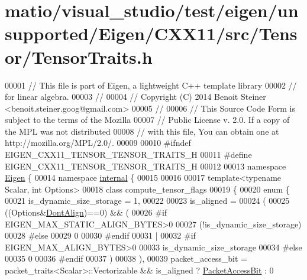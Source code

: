 \hypertarget{matio_2visual__studio_2test_2eigen_2unsupported_2_eigen_2_c_x_x11_2src_2_tensor_2_tensor_traits_8h_source}{}\section{matio/visual\+\_\+studio/test/eigen/unsupported/\+Eigen/\+C\+X\+X11/src/\+Tensor/\+Tensor\+Traits.h}
\label{matio_2visual__studio_2test_2eigen_2unsupported_2_eigen_2_c_x_x11_2src_2_tensor_2_tensor_traits_8h_source}

\begin{DoxyCode}
00001 \textcolor{comment}{// This file is part of Eigen, a lightweight C++ template library}
00002 \textcolor{comment}{// for linear algebra.}
00003 \textcolor{comment}{//}
00004 \textcolor{comment}{// Copyright (C) 2014 Benoit Steiner <benoit.steiner.goog@gmail.com>}
00005 \textcolor{comment}{//}
00006 \textcolor{comment}{// This Source Code Form is subject to the terms of the Mozilla}
00007 \textcolor{comment}{// Public License v. 2.0. If a copy of the MPL was not distributed}
00008 \textcolor{comment}{// with this file, You can obtain one at http://mozilla.org/MPL/2.0/.}
00009 
00010 \textcolor{preprocessor}{#ifndef EIGEN\_CXX11\_TENSOR\_TENSOR\_TRAITS\_H}
00011 \textcolor{preprocessor}{#define EIGEN\_CXX11\_TENSOR\_TENSOR\_TRAITS\_H}
00012 
00013 \textcolor{keyword}{namespace }\hyperlink{namespace_eigen}{Eigen} \{
00014 \textcolor{keyword}{namespace }\hyperlink{namespaceinternal}{internal} \{
00015 
00016 
00017 \textcolor{keyword}{template}<\textcolor{keyword}{typename} Scalar, \textcolor{keywordtype}{int} Options>
00018 \textcolor{keyword}{class }compute\_tensor\_flags
00019 \{
00020   \textcolor{keyword}{enum} \{
00021     is\_dynamic\_size\_storage = 1,
00022 
00023     is\_aligned =
00024     (
00025         ((Options&\hyperlink{group__enums_ggaacded1a18ae58b0f554751f6cdf9eb13a40a452614141522dd313363dbbd65726}{DontAlign})==0) && (
00026 \textcolor{preprocessor}{#if EIGEN\_MAX\_STATIC\_ALIGN\_BYTES>0}
00027             (!is\_dynamic\_size\_storage)
00028 #\textcolor{keywordflow}{else}
00029             0
00030 #endif
00031             |
00032 #\textcolor{keywordflow}{if} EIGEN\_MAX\_ALIGN\_BYTES>0
00033             is\_dynamic\_size\_storage
00034 #\textcolor{keywordflow}{else}
00035             0
00036 #endif
00037       )
00038      ),
00039     packet\_access\_bit = packet\_traits<Scalar>::Vectorizable && is\_aligned ? 
      \hyperlink{group__flags_ga1a306a438e1ab074e8be59512e887b9f}{PacketAccessBit} : 0

\end{DoxyCode}
